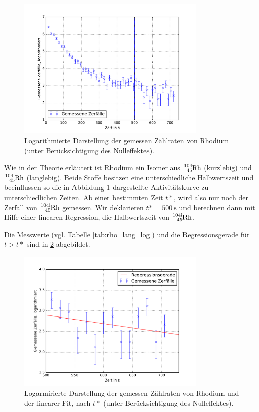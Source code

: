\begin{figure}
  \centering
  \includegraphics[width=0.8\textwidth]{pics/ra_all.pdf}
  \caption{Logarithmierte Darstellung der gemessen Zählraten von Rhodium (unter Berücksichtigung des Nulleffektes).}
  \label{fig: plot_rhodium}
\end{figure}




Wie in der Theorie erläutert ist Rhodium ein Isomer aus $\ce{^{104}_{45} Rh}$ (kurzlebig) und %
$\ce{^{104i}_{45} Rh}$ (langlebig). Beide Stoffe besitzen eine unterschiedliche Halbwertszeit und
beeinflussen so die in Abbildung \ref{fig: plot_rhodium} dargestellte Aktivitätskurve zu unterschiedlichen
Zeiten.
Ab einer bestimmten Zeit $t*$, wird also nur noch der Zerfall von $\ce{^{104i}_{45} Rh}$
gemessen.
Wir deklarieren $t*=\SI{500}{\second}$ und berechnen dann mit Hilfe einer linearen Regression, %
die Halbwertszeit von $\ce{^{104i}_{45} Rh}$.

Die Messwerte (vgl. Tabelle \ref{tab:rho_lang_log}) und die Regressionsgerade für $t>t*$ sind in \ref{fig: plot_rhodium_lang} abgebildet.

\begin{figure}
  \centering
  \includegraphics[width=0.8\textwidth]{pics/rhodium_lang_miterror.pdf}
  \caption{Logarmirierte Darstellung der gemessen Zählraten von Rhodium und der linearer Fit, nach $t*$  (unter Berücksichtigung des Nulleffektes).} %
  \label{fig: plot_rhodium_lang}
\end{figure}

